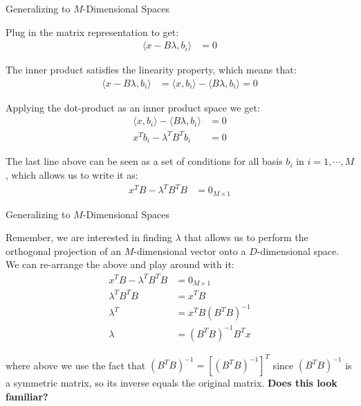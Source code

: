 \begin{frame}{Generalizing to $M$-Dimensional Spaces}

    Plug in the matrix representation to get:
    \begin{align*}
        \langle x - B \lambda, b_i \rangle &= 0
    \end{align*}

    The inner product satisfies the linearity property, which means that:
    \begin{align*}
        \langle x - B \lambda, b_i \rangle &= \langle x, b_i \rangle - \langle B \lambda, b_i \rangle= 0
    \end{align*}

    Applying the dot-product as an inner product space we get:
    \begin{align*}
        \langle x, b_i \rangle - \langle B \lambda, b_i \rangle &= 0
        \\
        x^T b_i - \lambda^T B^T b_i &= 0
    \end{align*}

    The last line above can be seen as a set of conditions for all basis $b_i$ in $i = 1, \cdots, M$, which allows us to write it as:
    \begin{align*}
        x^T B - \lambda^T B^T B &= 0_{M \times 1}
    \end{align*}
    
\end{frame}

\begin{frame}{Generalizing to $M$-Dimensional Spaces}

    Remember, we are interested in finding $\lambda$ that allows us to perform the orthogonal projection of an $M$-dimensional vector onto a $D$-dimensional space. We can re-arrange the above and play around with it:
    \begin{align*}
        x^T B - \lambda^T B^T B &= 0_{M \times 1}
        \\
        \lambda^T B^T B &= x^T B
        \\
        \lambda^T &= x^T B (B^T B)^{-1}
        \\
        \lambda &= (B^T B)^{-1} B^T x
    \end{align*}

    where above we use the fact that $(B^T B)^{-1} = [(B^T B)^{-1}]^T$ since $(B^T B)^{-1}$ is a symmetric matrix, so its inverse equals the original matrix. \textbf{Does this look familiar?}
    
\end{frame}

